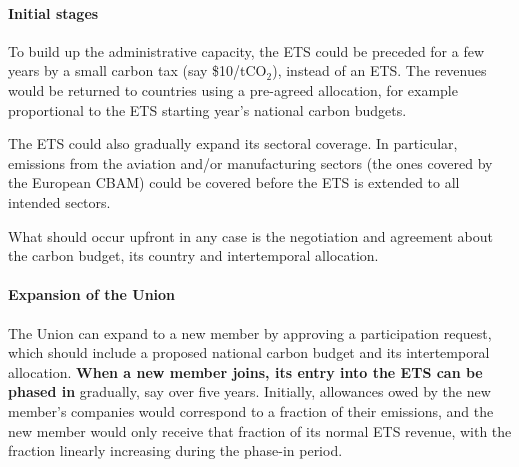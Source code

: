 \documentclass[12pt,english]{article}
\begin{document}

\paragraph{Initial stages}

To build up the administrative capacity, the ETS could be preceded for a few years by a small carbon tax (say \$10/tCO$_\text{2}$), instead of an ETS. The revenues would be returned to countries using a pre-agreed allocation, for example proportional to the ETS starting year's national carbon budgets.

The ETS could also gradually expand its sectoral coverage. In particular, emissions from the aviation and/or manufacturing sectors (the ones covered by the European CBAM) could be covered before the ETS is extended to all intended sectors.

What should occur upfront in any case is the negotiation and agreement about the carbon budget, its country and intertemporal allocation.

\paragraph{Expansion of the Union}
The Union can expand to a new member by approving a participation request, which should include a proposed national carbon budget and its intertemporal allocation. \textbf{When a new member joins, its entry into the ETS can be phased in} gradually, say over five years. Initially, allowances owed by the new member's companies would correspond to a fraction of their emissions, and the new member would only receive that fraction of its normal ETS revenue, with the fraction linearly increasing during the phase-in period. 
\end{document}
